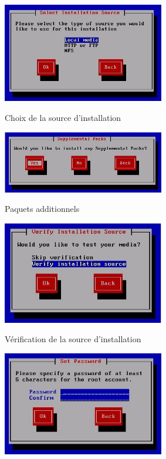 \begin{center}
\includegraphics[width=200pt]{images/4.png}
\end{center}
\begin{center}
Choix de la source d'installation
\end{center}
\begin{center}
\includegraphics[width=200pt]{images/5.png}
\end{center}
\begin{center}
Paquets additionnels
\end{center}
\begin{center}
\includegraphics[width=200pt]{images/6.png}
\end{center}
\begin{center}
Vérification de la source d'installation
\end{center}
\begin{center}
\includegraphics[width=200pt]{images/7.png}
\end{center}
